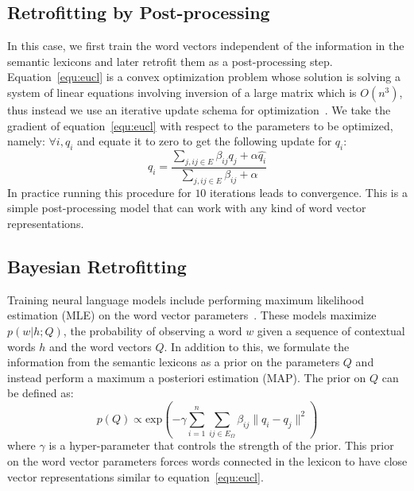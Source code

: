 \documentclass[11pt]{article}
\begin{document}
\subsection{Retrofitting by Post-processing}
\label{sec:post-proc}

In this case, we first train the word vectors independent of the information in the semantic lexicons
and later retrofit them as a post-processing step. Equation~\ref{equ:eucl} is a convex 
optimization problem whose solution is solving a system of linear equations involving inversion of a 
large matrix which is $O(n^3)$, thus instead we use an iterative update schema for 
optimization~\cite{Bengio+al-ssl-2006,Subramanya:2010:EGS:1870658.1870675,das-petrov:2011:ACL-HLT2011,das-smith:2011:ACL-HLT2011}.
We take the gradient of equation~\ref{equ:eucl} with respect to the parameters to be optimized, namely: $\forall i, q_i$ and equate it to zero to get the following update for $q_i$:
\begin{equation}
  \label{equ:update-vector}
q_i = \frac{\sum_{j, ij \in E} \beta_{ij} q_j + \alpha \hat{q_i}}{\sum_{j, ij \in E} \beta_{ij} + \alpha}
\end{equation}
In practice running this procedure for $10$ iterations leads to convergence. This is a simple 
post-processing model that can work with any kind of word vector representations.

\subsection{Bayesian Retrofitting}
\label{sec:during-training}

Training neural language models include performing maximum likelihood estimation (MLE) on the 
word vector parameters~\cite{Collobert:2008:UAN:1390156.1390177,MnihTeh2012,mikolov2013efficient}. 
These models maximize $p(w|h;Q)$, the probability of observing a word $w$ given a sequence of contextual words
$h$ and the word vectors $Q$. In addition to this, we formulate the information from the semantic lexicons
as a prior on the parameters $Q$ and instead perform a maximum a posteriori estimation (MAP). The prior
on $Q$ can be defined as:
\begin{equation}
  \label{equ:prior}
  p(Q) \propto \text{exp}\left(-\gamma\sum_{i=1}^{n}\sum_{ij \in E_{\Omega}}\beta_{ij} \lVert q_{i}-q_{j} \rVert^{2}\right)
\end{equation}
where $\gamma$ is a hyper-parameter that controls the strength of the prior. This prior on the word
vector parameters forces words connected in the lexicon to have close vector representations similar to
equation~\ref{equ:eucl}.
\end{document}
